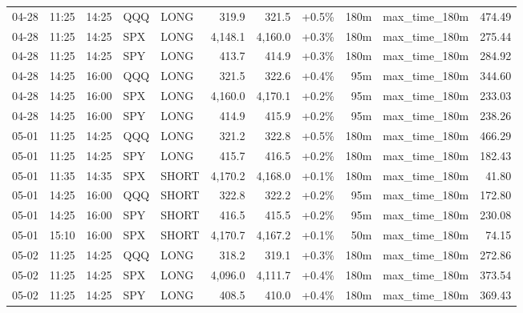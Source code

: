 \documentclass[11pt,a4paper,twoside]{article}
\begin{document}
\begin{center}
\begin{longtable}{>{\color{txtmain}}l l l l l r r r r >{\color{txtmain}}l r}
04-28 & 11:25 & 14:25 & QQQ & LONG & 319.9 & 321.5 & \textcolor{wingreen}{+0.5\%} & 180m & max\_time\_180m & \textcolor{wingreen}{474.49} \\
04-28 & 11:25 & 14:25 & SPX & LONG & 4,148.1 & 4,160.0 & \textcolor{wingreen}{+0.3\%} & 180m & max\_time\_180m & \textcolor{wingreen}{275.44} \\
04-28 & 11:25 & 14:25 & SPY & LONG & 413.7 & 414.9 & \textcolor{wingreen}{+0.3\%} & 180m & max\_time\_180m & \textcolor{wingreen}{284.92} \\
04-28 & 14:25 & 16:00 & QQQ & LONG & 321.5 & 322.6 & \textcolor{wingreen}{+0.4\%} & 95m & max\_time\_180m & \textcolor{wingreen}{344.60} \\
04-28 & 14:25 & 16:00 & SPX & LONG & 4,160.0 & 4,170.1 & \textcolor{wingreen}{+0.2\%} & 95m & max\_time\_180m & \textcolor{wingreen}{233.03} \\
04-28 & 14:25 & 16:00 & SPY & LONG & 414.9 & 415.9 & \textcolor{wingreen}{+0.2\%} & 95m & max\_time\_180m & \textcolor{wingreen}{238.26} \\
05-01 & 11:25 & 14:25 & QQQ & LONG & 321.2 & 322.8 & \textcolor{wingreen}{+0.5\%} & 180m & max\_time\_180m & \textcolor{wingreen}{466.29} \\
05-01 & 11:25 & 14:25 & SPY & LONG & 415.7 & 416.5 & \textcolor{wingreen}{+0.2\%} & 180m & max\_time\_180m & \textcolor{wingreen}{182.43} \\
05-01 & 11:35 & 14:35 & SPX & SHORT & 4,170.2 & 4,168.0 & \textcolor{wingreen}{+0.1\%} & 180m & max\_time\_180m & \textcolor{wingreen}{41.80} \\
05-01 & 14:25 & 16:00 & QQQ & SHORT & 322.8 & 322.2 & \textcolor{wingreen}{+0.2\%} & 95m & max\_time\_180m & \textcolor{wingreen}{172.80} \\
05-01 & 14:25 & 16:00 & SPY & SHORT & 416.5 & 415.5 & \textcolor{wingreen}{+0.2\%} & 95m & max\_time\_180m & \textcolor{wingreen}{230.08} \\
05-01 & 15:10 & 16:00 & SPX & SHORT & 4,170.7 & 4,167.2 & \textcolor{wingreen}{+0.1\%} & 50m & max\_time\_180m & \textcolor{wingreen}{74.15} \\
05-02 & 11:25 & 14:25 & QQQ & LONG & 318.2 & 319.1 & \textcolor{wingreen}{+0.3\%} & 180m & max\_time\_180m & \textcolor{wingreen}{272.86} \\
05-02 & 11:25 & 14:25 & SPX & LONG & 4,096.0 & 4,111.7 & \textcolor{wingreen}{+0.4\%} & 180m & max\_time\_180m & \textcolor{wingreen}{373.54} \\
05-02 & 11:25 & 14:25 & SPY & LONG & 408.5 & 410.0 & \textcolor{wingreen}{+0.4\%} & 180m & max\_time\_180m & \textcolor{wingreen}{369.43} \\

\end{longtable}
\end{center}
\end{document}
